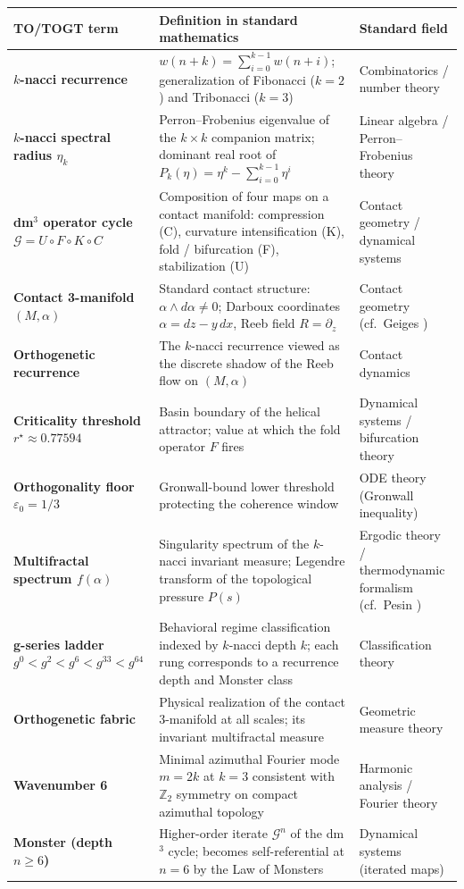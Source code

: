 \documentclass[12pt,a4paper]{article}
\newcommand{\etak}{\eta_k}
\newcommand{\rstar}{r^\star}
\newcommand{\epszero}{\varepsilon_0}
\newcommand{\Gop}{\mathcal{G}}
\newcommand{\falph}{f(\alpha)}
\newcommand{\kn}{$k$-nacci}
\begin{document}
\begin{glossarybox}
\small
\begin{tabularx}{\linewidth}{>{\bfseries}p{3.8cm} X p{3.8cm}}
\toprule
TO/TOGT term & Definition in standard mathematics & Standard field \\
\midrule
$k$-nacci recurrence &
  $w(n+k)=\sum_{i=0}^{k-1}w(n+i)$; generalization of Fibonacci ($k=2$)
  and Tribonacci ($k=3$) & Combinatorics / number theory \\[4pt]
$k$-nacci spectral radius $\etak$ &
  Perron--Frobenius eigenvalue of the $k\times k$ companion matrix;
  dominant real root of $P_k(\eta)=\eta^k-\sum_{i=0}^{k-1}\eta^i$ &
  Linear algebra / Perron--Frobenius theory \\[4pt]
dm$^3$ operator cycle $\Gop=U\circ F\circ K\circ C$ &
  Composition of four maps on a contact manifold:
  compression (C), curvature intensification (K),
  fold / bifurcation (F), stabilization (U) &
  Contact geometry / dynamical systems \\[4pt]
Contact 3-manifold $(M,\alpha)$ &
  Standard contact structure: $\alpha\wedge d\alpha\neq 0$;
  Darboux coordinates $\alpha=dz-y\,dx$, Reeb field $R=\partial_z$ &
  Contact geometry (cf.\ Geiges \cite{geiges2008}) \\[4pt]
Orthogenetic recurrence &
  The $k$-nacci recurrence viewed as the discrete shadow of the
  Reeb flow on $(M,\alpha)$ & Contact dynamics \\[4pt]
Criticality threshold $\rstar\approx 0.77594$ &
  Basin boundary of the helical attractor; value at which the
  fold operator $F$ fires & Dynamical systems / bifurcation theory \\[4pt]
Orthogonality floor $\epszero=1/3$ &
  Gronwall-bound lower threshold protecting the coherence window &
  ODE theory (Gronwall inequality) \\[4pt]
Multifractal spectrum $\falph$ &
  Singularity spectrum of the $k$-nacci invariant measure;
  Legendre transform of the topological pressure $P(s)$ &
  Ergodic theory / thermodynamic formalism
  (cf.\ Pesin \cite{pesin1997}) \\[4pt]
g-series ladder $g^0<g^2<g^6<g^{33}<g^{64}$ &
  Behavioral regime classification indexed by \kn{} depth $k$;
  each rung corresponds to a recurrence depth and Monster class &
  Classification theory \\[4pt]
Orthogenetic fabric &
  Physical realization of the contact 3-manifold at all scales;
  its invariant multifractal measure & Geometric measure theory \\[4pt]
Wavenumber 6 &
  Minimal azimuthal Fourier mode $m=2k$ at $k=3$ consistent with
  $\mathbb{Z}_2$ symmetry on compact azimuthal topology &
  Harmonic analysis / Fourier theory \\[4pt]
Monster (depth $n\geq 6$) &
  Higher-order iterate $\Gop^n$ of the dm$^3$ cycle;
  becomes self-referential at $n=6$ by the Law of Monsters &
  Dynamical systems (iterated maps) \\
\bottomrule
\end{tabularx}
\end{glossarybox}
\end{document}
